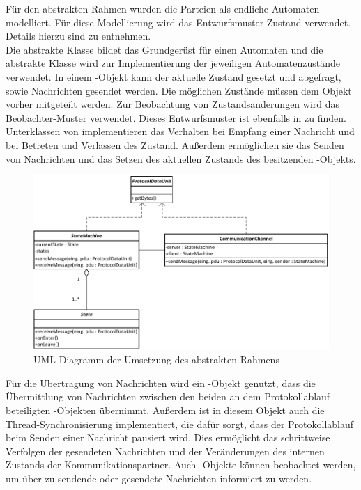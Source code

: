 Für den abstrakten Rahmen wurden die Parteien als endliche Automaten modelliert. Für diese Modellierung wird das Entwurfsmuster Zustand verwendet. Details hierzu sind \cite{freeman04} zu entnehmen.\\
Die abstrakte Klasse  bildet das Grundgerüst für einen Automaten und die abstrakte Klasse  wird zur Implementierung der jeweiligen Automatenzustände verwendet. In einem -Objekt kann der aktuelle Zustand gesetzt und abgefragt, sowie Nachrichten gesendet werden. Die möglichen Zustände müssen dem Objekt vorher mitgeteilt werden. Zur Beobachtung von Zustandsänderungen wird das Beobachter-Muster verwendet. Dieses Entwurfsmuster ist ebenfalls in \cite{freeman04} zu finden.\\
Unterklassen von  implementieren das Verhalten bei Empfang einer Nachricht und bei Betreten und Verlassen des Zustand. Außerdem ermöglichen sie das Senden von Nachrichten und das Setzen des aktuellen Zustands des besitzenden -Objekts.

\begin{figure}
	\centering
	\includegraphics[scale=0.9]{Diagrams/uml/abstract_pdu_state_machine_channel.pdf} %
	\caption{UML-Diagramm der Umsetzung des abstrakten Rahmens}
	\label{fig_uml_abstract_state_machine}
\end{figure}

Für die Übertragung von Nachrichten wird ein -Objekt genutzt, dass die Übermittlung von Nachrichten zwischen den beiden an dem Protokollablauf beteiligten -Objekten übernimmt. Außerdem ist in diesem Objekt auch die Thread-Synchronisierung implementiert, die dafür sorgt, dass der Protokollablauf beim Senden einer Nachricht pausiert wird. Dies ermöglicht das schrittweise Verfolgen der gesendeten Nachrichten und der Veränderungen des internen Zustands der Kommunikationspartner. Auch -Objekte können beobachtet werden, um über zu sendende oder gesendete Nachrichten informiert zu werden.


